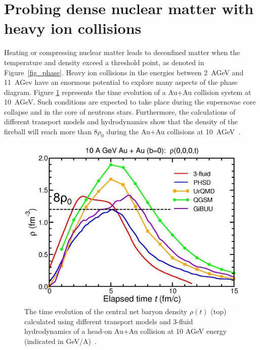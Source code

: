 \section{Probing dense nuclear matter with heavy ion collisions}

Heating or compressing nuclear matter leads to deconfined matter when the temperature and density exceed a threshold point, as denoted in Figure~\ref{fig_phase}. Heavy ion collisions in the energies between 2~AGeV and 11~AGev have an enormous potential to explore many aspects of the phase diagram. Figure \ref{fig:cbm_density} represents the time evolution of a Au+Au collision system at 10~AGeV. Such conditions are expected to take place during the supernovae core collapse and in the core of neutrons stars. Furthermore, the calculations of different transport models and hydrodynamics show that the density of the fireball will reach more than $8\rho_{0}$ during the Au+Au collisions at 10~AGeV~\cite{CBM_physics}.
\newpage
\begin{figure}[!h]
    \centering
    \includegraphics[width=0.65\columnwidth]{Chapter1/images/CBM_density.png}
    \caption{The time evolution of the central net baryon density $\rho(t)$ (top) calculated using different transport models and 3-fluid hydrodynamics of a head-on Au+Au collision at 10 AGeV energy (indicated in GeV/A)~\cite{CBM_physics}.}
    \label{fig:cbm_density}
\end{figure}


